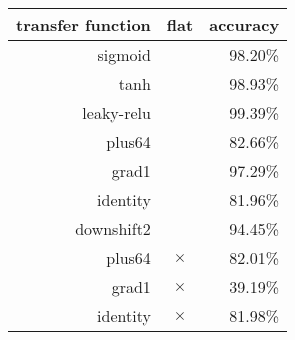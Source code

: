 \begin{tabular}{rcr}
{\bf transfer function} & {\bf flat} & {\bf accuracy} \\
\hline 
sigmoid &   & 98.20\% \\
tanh &   & 98.93\% \\
leaky-relu &   & 99.39\% \\
plus64 &   & 82.66\% \\
grad1 &   & 97.29\% \\
identity &   & 81.96\% \\
downshift2 &   & 94.45\% \\
plus64 & $\times$ & 82.01\% \\
grad1 & $\times$ & 39.19\% \\
identity & $\times$ & 81.98\% \\
\end{tabular}
